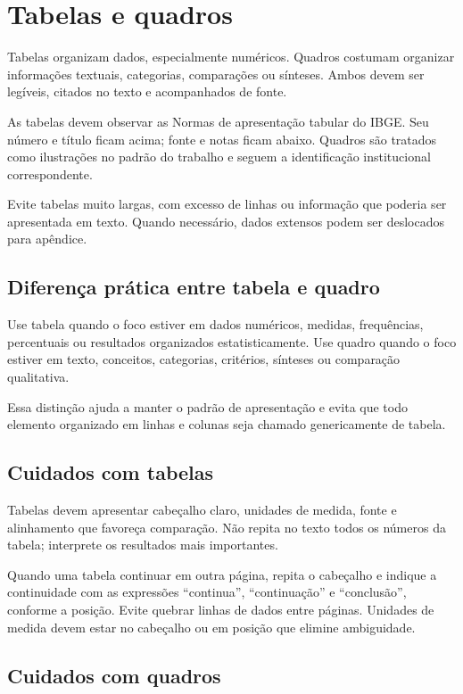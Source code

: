\section{Tabelas e quadros}

Tabelas organizam dados, especialmente numéricos. Quadros costumam organizar informações textuais, categorias, comparações ou sínteses. Ambos devem ser legíveis, citados no texto e acompanhados de fonte.

As tabelas devem observar as Normas de apresentação tabular do IBGE. Seu número e título ficam acima; fonte e notas ficam abaixo. Quadros são tratados como ilustrações no padrão do trabalho e seguem a identificação institucional correspondente.

Evite tabelas muito largas, com excesso de linhas ou informação que poderia ser apresentada em texto. Quando necessário, dados extensos podem ser deslocados para apêndice.

\subsection{Diferença prática entre tabela e quadro}

Use tabela quando o foco estiver em dados numéricos, medidas, frequências, percentuais ou resultados organizados estatisticamente. Use quadro quando o foco estiver em texto, conceitos, categorias, critérios, sínteses ou comparação qualitativa.

Essa distinção ajuda a manter o padrão de apresentação e evita que todo elemento organizado em linhas e colunas seja chamado genericamente de tabela.

\subsection{Cuidados com tabelas}

Tabelas devem apresentar cabeçalho claro, unidades de medida, fonte e alinhamento que favoreça comparação. Não repita no texto todos os números da tabela; interprete os resultados mais importantes.

Quando uma tabela continuar em outra página, repita o cabeçalho e indique a continuidade com as expressões ``continua'', ``continuação'' e ``conclusão'', conforme a posição. Evite quebrar linhas de dados entre páginas. Unidades de medida devem estar no cabeçalho ou em posição que elimine ambiguidade.

\subsection{Cuidados com quadros}

